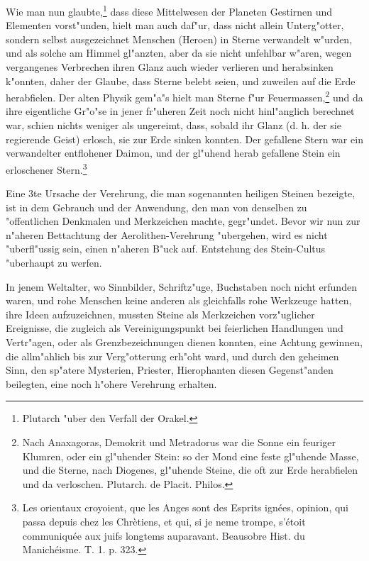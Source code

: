 \documentclass[a4paper, 11pt, oneside, polutonikogreek, german]{article}
\begin{document}
Wie man nun glaubte,\footnote{Plutarch "uber den Verfall der Orakel.} dass diese Mittelwesen der Planeten Gestirnen und Elementen vorst"unden, hielt man auch daf"ur, dass nicht allein Unterg"otter, sondern selbst ausgezeichnet Menschen (Heroen) in Sterne verwandelt w"urden, und als solche am Himmel gl"anzten, aber da sie nicht unfehlbar w"aren, wegen vergangenes Verbrechen ihren Glanz auch wieder verlieren und herabsinken k"onnten, daher der Glaube, dass Sterne belebt seien, und zuweilen auf die Erde herabfielen. Der alten Physik gem"a"s hielt man Sterne f"ur Feuermassen,\footnote{Nach Anaxagoras, Demokrit und Metradorus war die Sonne ein feuriger Klumren, oder ein gl"uhender Stein: so der Mond eine feste gl"uhende Masse, und die Sterne, nach Diogenes, gl"uhende Steine, die oft zur Erde herabfielen und da verloschen. Plutarch. de Placit. Philos.} und da ihre eigentliche Gr"o"se in jener fr"uheren Zeit noch nicht hinl"anglich berechnet war, schien nichts weniger als ungereimt, dass, sobald ihr Glanz (d. h. der sie regierende Geist) erlosch, sie zur Erde sinken konnten. Der gefallene Stern war ein verwandelter entflohener Daimon, und der gl"uhend herab gefallene Stein ein erloschener Stern.\footnote{Les orientaux croyoient, que les Anges sont des Esprits ignées, opinion, qui passa depuis chez les Chrètiens, et qui, si je neme trompe, s'étoit communiquée aux juifs longtems auparavant. Beausobre Hist. du Manichéisme. T. 1. p. 323.}

Eine 3te Ursache der Verehrung, die man sogenannten heiligen Steinen bezeigte, ist in dem Gebrauch und der Anwendung, den man von denselben zu "offentlichen Denkmalen und Merkzeichen machte, gegr"undet. Bevor wir nun zur n"aheren Bettachtung der Aerolithen-Verehrung "ubergehen, wird es nicht "uberfl"ussig sein, einen n"aheren B"uck auf. Entstehung des Stein-Cultus "uberhaupt zu werfen.

In jenem Weltalter, wo Sinnbilder, Schriftz"uge, Buchstaben noch nicht erfunden waren, und rohe Menschen keine anderen als gleichfalls rohe Werkzeuge hatten, ihre Ideen aufzuzeichnen, mussten Steine als Merkzeichen vorz"uglicher Ereignisse, die zugleich als Vereinigungspunkt bei feierlichen Handlungen und Vertr"agen, oder als Grenzbezeichnungen dienen konnten, eine Achtung gewinnen, die allm"ahlich bis zur Verg"otterung erh"oht ward, und durch den geheimen Sinn, den sp"atere Mysterien, Priester, Hierophanten diesen Gegenst"anden beilegten, eine noch h"ohere Verehrung erhalten.
\end{document}
